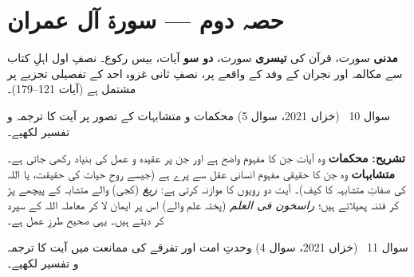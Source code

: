 
\section*{حصہ دوم --- سورۃ آل عمران}

\begin{nukta}
\textbf{مدنی} سورت، قرآن کی \textbf{تیسری} سورت، \textbf{دو سو} آیات، بیس
رکوع۔ نصفِ اول اہلِ کتاب سے مکالمہ اور نجران کے وفد کے واقعے پر، نصفِ ثانی
غزوہ احد کے تفصیلی تجزیے پر مشتمل ہے (آیات \textenglish{121--179})۔
\end{nukta}

\begin{sawal}{سوال \textenglish{10} \ \textnormal{\small(خزاں \textenglish{2021}، سوال \textenglish{5})}}
محکمات و متشابہات کے تصور پر آیت کا ترجمہ و تفسیر لکھیے۔
\end{sawal}

\begin{hal}

\medskip
\textbf{تشریح:} \textbf{محکمات} وہ آیات جن کا مفہوم واضح ہے اور جن پر عقیدہ و
عمل کی بنیاد رکھی جاتی ہے۔ \textbf{متشابہات} وہ جن کا حقیقی مفہوم انسانی عقل
سے پرے ہے (جیسے روحِ حیات کی حقیقت، یا اللہ کی صفاتِ متشابہہ کا کیف)۔ آیت دو
رویوں کا موازنہ کرتی ہے: \emph{زیغ} (کجی) والے متشابہ کے پیچھے پڑ کر فتنہ
پھیلاتے ہیں؛ \emph{راسخون فی العلم} (پختہ علم والے) اس پر ایمان لا کر معاملہ
اللہ کے سپرد کر دیتے ہیں۔ یہی صحیح طرزِ عمل ہے۔
\end{hal}

\begin{sawal}{سوال \textenglish{11} \ \textnormal{\small(خزاں \textenglish{2021}، سوال \textenglish{4})}}
وحدتِ امت اور تفرقے کی ممانعت میں آیت کا ترجمہ و تفسیر لکھیے۔
\end{sawal}

